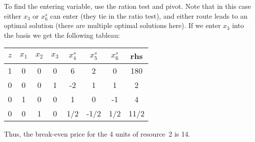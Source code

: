 To find the entering variable, use the ration test and pivot.  Note that in this case either $x_3$ or $x^s_6$ can enter (they tie in the ratio test), and either route leads to an optimal solution (there are multiple optimal solutions here).  If we enter $x_3$ into the basis we get the following tableau: 

\begin{center} \begin{tabular} {|c|c|c|c|c|c|c|c|} \hline 
$z$ 	& $x_1$ 	& $x_2$ 	& $x_3$ 	& $x^{s}_4$ 	& $x^{s}_5$ & $x^{s}_6$ & rhs   \\ \hline \hline 
  1  	& 0     		& 0     		& 0     		& 6     				& 2     			& 0     & 180   \\ \hline  
  0  	& 0     		& 0     		& 1     		& -2    				& 1     & 1     & 2     \\ \hline  
  0   	& 1     		& 0    	 	& 0     		& 1     				& 0     & -1    & 4    \\ \hline  
  0  	& 0     		& 1     		& 0     		& 1/2   				& -1/2  & 1/2   & 11/2     \\ \hline
\end{tabular} \end{center}
Thus, the break-even price for the 4 units of resource~2 is 14.


